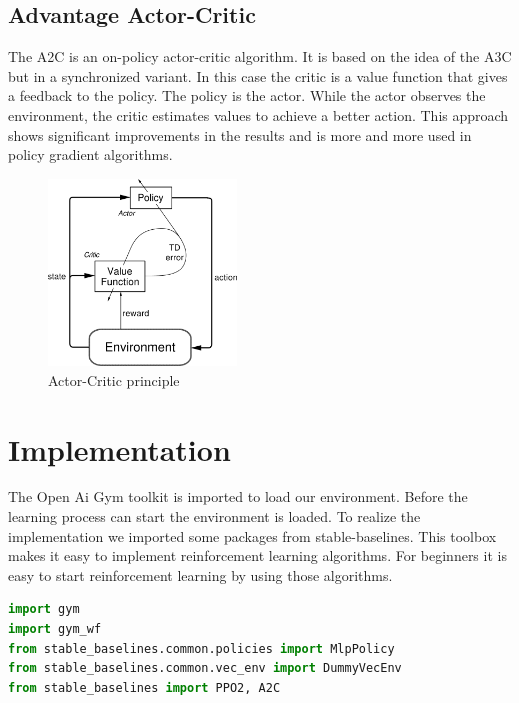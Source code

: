 \documentclass[sigconf]{acmart}
\begin{document}
\subsection{Advantage Actor-Critic}
 The A2C is an on-policy actor-critic algorithm. 
 It is based on the idea of the A3C but in a synchronized variant.
 In this case the critic is a value function that gives a feedback to the policy.
 The policy is the actor. While the actor observes the environment, the critic estimates values to achieve a better action.
 This approach shows significant improvements in the results and is more and more used in policy gradient algorithms.
 
 
\begin{figure}[ht]
 \centering
 \includegraphics[width=50mm]{actor-critic.png}
  \caption{Actor-Critic principle}
  \label{fig:loss}
\end{figure}
 

\section{Implementation}
The Open Ai Gym toolkit is imported to load our environment.
Before the learning process can start the environment is loaded.
To realize the implementation we imported some packages from stable-baselines. 
This toolbox makes it easy to implement reinforcement learning algorithms.
For beginners it is easy to start reinforcement learning by using those algorithms.

\vspace{2.5mm}

\begin{lstlisting}[language=Python, caption=Imports]
import gym
import gym_wf
from stable_baselines.common.policies import MlpPolicy
from stable_baselines.common.vec_env import DummyVecEnv
from stable_baselines import PPO2, A2C
\end{lstlisting}
\vspace{2.5mm} 
 
\end{document}
